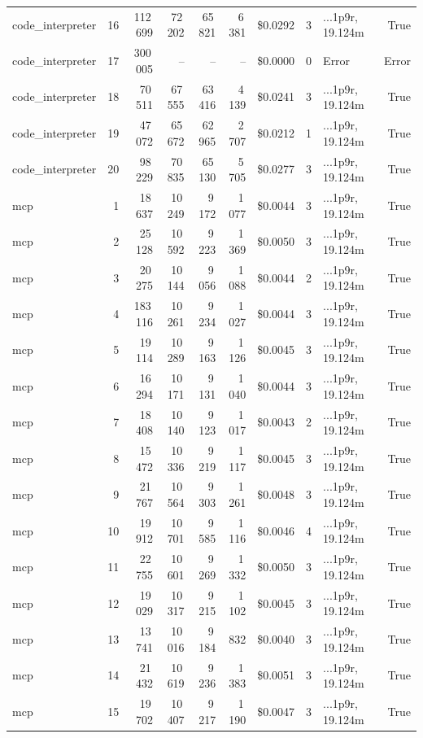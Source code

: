 \documentclass[a4paper,11pt]{article}
\begin{document}
\begin{table}[H]
{\begin{tabular}{l r r r r r r r l r}
code\_interpreter & 16 & 112\,699 & 72\,202 & 65\,821 & 6\,381 & \$0.0292 & 3 & ...1p9r, 19.124m & True \\
code\_interpreter & 17 & 300\,005 & -- & -- & -- & \$0.0000 & 0 & Error & Error \\
code\_interpreter & 18 & 70\,511 & 67\,555 & 63\,416 & 4\,139 & \$0.0241 & 3 & ...1p9r, 19.124m & True \\
code\_interpreter & 19 & 47\,072 & 65\,672 & 62\,965 & 2\,707 & \$0.0212 & 1 & ...1p9r, 19.124m & True \\
code\_interpreter & 20 & 98\,229 & 70\,835 & 65\,130 & 5\,705 & \$0.0277 & 3 & ...1p9r, 19.124m & True \\
\midrule
mcp & 1 & 18\,637 & 10\,249 & 9\,172 & 1\,077 & \$0.0044 & 3 & ...1p9r, 19.124m & True \\
mcp & 2 & 25\,128 & 10\,592 & 9\,223 & 1\,369 & \$0.0050 & 3 & ...1p9r, 19.124m & True \\
mcp & 3 & 20\,275 & 10\,144 & 9\,056 & 1\,088 & \$0.0044 & 2 & ...1p9r, 19.124m & True \\
mcp & 4 & 183\,116 & 10\,261 & 9\,234 & 1\,027 & \$0.0044 & 3 & ...1p9r, 19.124m & True \\
mcp & 5 & 19\,114 & 10\,289 & 9\,163 & 1\,126 & \$0.0045 & 3 & ...1p9r, 19.124m & True \\
mcp & 6 & 16\,294 & 10\,171 & 9\,131 & 1\,040 & \$0.0044 & 3 & ...1p9r, 19.124m & True \\
mcp & 7 & 18\,408 & 10\,140 & 9\,123 & 1\,017 & \$0.0043 & 2 & ...1p9r, 19.124m & True \\
mcp & 8 & 15\,472 & 10\,336 & 9\,219 & 1\,117 & \$0.0045 & 3 & ...1p9r, 19.124m & True \\
mcp & 9 & 21\,767 & 10\,564 & 9\,303 & 1\,261 & \$0.0048 & 3 & ...1p9r, 19.124m & True \\
mcp & 10 & 19\,912 & 10\,701 & 9\,585 & 1\,116 & \$0.0046 & 4 & ...1p9r, 19.124m & True \\
mcp & 11 & 22\,755 & 10\,601 & 9\,269 & 1\,332 & \$0.0050 & 3 & ...1p9r, 19.124m & True \\
mcp & 12 & 19\,029 & 10\,317 & 9\,215 & 1\,102 & \$0.0045 & 3 & ...1p9r, 19.124m & True \\
mcp & 13 & 13\,741 & 10\,016 & 9\,184 & 832 & \$0.0040 & 3 & ...1p9r, 19.124m & True \\
mcp & 14 & 21\,432 & 10\,619 & 9\,236 & 1\,383 & \$0.0051 & 3 & ...1p9r, 19.124m & True \\
mcp & 15 & 19\,702 & 10\,407 & 9\,217 & 1\,190 & \$0.0047 & 3 & ...1p9r, 19.124m & True \\

\end{tabular}}
\end{table}
\end{document}
